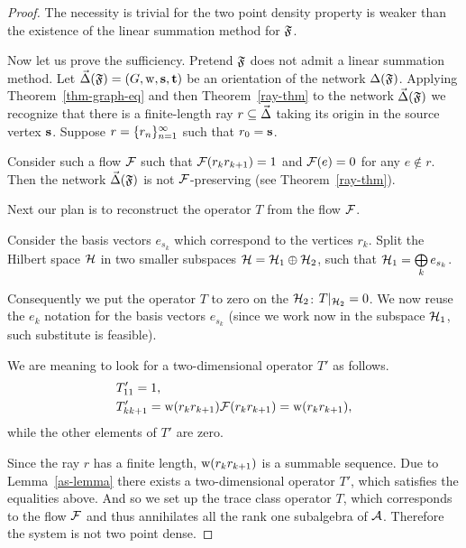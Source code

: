 \documentclass[12pt]{amsart}
\begin{document}
      \begin{proof}
        The necessity is trivial for the two point density property is weaker than the existence of the linear summation method for $\fsys$.

        Now let us prove the sufficiency.
        Pretend $\fsys$ does not admit a linear summation method.
        Let $\onet(\fsys) = (G, \wtp, \source, \sink)$ be an orientation of the network $\net(\fsys)$.
        Applying Theorem~\ref{thm-graph-eq} and then Theorem~\ref{ray-thm} to the network $\onet(\fsys)$
          we recognize that there is a finite-length ray $r \subseteq \onet$ taking its origin
          in the source vertex $\source$.
        Suppose $r = \seq{r}$ such that $r_0 = \source$.

        Consider such a flow $\flowpos$ such that $\flowpos(r_k r_{k+1}) = 1$ and $\flowpos(e) = 0$ for any $e \not \in r$.
        Then the network $\onet(\fsys)$ is not $\flowpos$-preserving (see Theorem~\ref{ray-thm}).

        Next our plan is to reconstruct the operator $T$ from the flow $\flowpos$.

        Consider the basis vectors $e_{s_k}$ which correspond to the vertices $r_k$.
        Split the Hilbert space $\cal{H}$ in two smaller subspaces $\cal{H} = \cal{H}_1 \oplus \cal{H}_2$,
          such that $\cal{H}_1 = \bigoplus\limits_k e_{s_k}$.

        Consequently we put the operator $T$ to zero on the $\cal{H}_2$: $T\vert_{\cal{H}_2} = 0$.
        We now reuse the $e_k$ notation for the basis vectors $e_{s_k}$ (since we work now in the subspace $\cal{H}_1$,
          such substitute is feasible).

        We are meaning to look for a two-dimensional operator $T'$ as follows.
        \begin{align*}
          &T'_{11} = 1,\\
          &T'_{k k+1} = \wtp(r_k r_{k+1}) \flowpos(r_k r_{k+1}) = \wtp(r_k r_{k+1}),
        \end{align*}
          while the other elements of $T'$ are zero.

        Since the ray $r$ has a finite length, $\wtp(r_k r_{k+1})$ is a summable sequence.
        Due to Lemma~\ref{as-lemma} there exists a two-dimensional operator $T'$, which satisfies the equalities above.
        And so we set up the trace class operator $T$, which corresponds to the flow $\flowpos$ and thus annihilates all the rank one
          subalgebra of $\cal{A}$.
        Therefore the system is not two point dense.
    \end{proof}
\end{document}
